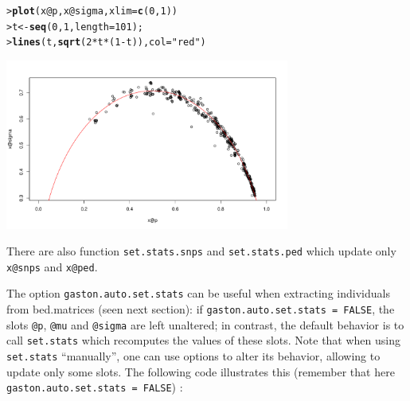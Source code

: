 \documentclass{article}\usepackage[]{graphicx}\usepackage[]{color}
\makeatletter
\newcommand{\hlnum}[1]{\textcolor[rgb]{0.686,0.059,0.569}{#1}}%
\newcommand{\hlstr}[1]{\textcolor[rgb]{0.192,0.494,0.8}{#1}}%
\newcommand{\hlopt}[1]{\textcolor[rgb]{0,0,0}{#1}}%
\newcommand{\hlstd}[1]{\textcolor[rgb]{0.345,0.345,0.345}{#1}}%
\newcommand{\hlkwb}[1]{\textcolor[rgb]{0.69,0.353,0.396}{#1}}%
\newcommand{\hlkwc}[1]{\textcolor[rgb]{0.333,0.667,0.333}{#1}}%
\newcommand{\hlkwd}[1]{\textcolor[rgb]{0.737,0.353,0.396}{\textbf{#1}}}%
\newenvironment{kframe}{%
 \def\at@end@of@kframe{}%
 \ifinner\ifhmode%
  \def\at@end@of@kframe{\end{minipage}}%
  \begin{minipage}{\columnwidth}%
 \fi\fi%
 \def\FrameCommand##1{\hskip\@totalleftmargin \hskip-\fboxsep
 \colorbox{shadecolor}{##1}\hskip-\fboxsep
     \hskip-\linewidth \hskip-\@totalleftmargin \hskip\columnwidth}%
 \MakeFramed {\advance\hsize-\width
   \@totalleftmargin\z@ \linewidth\hsize
   \@setminipage}}%
 {\par\unskip\endMakeFramed%
 \at@end@of@kframe}
\newenvironment{knitrout}{}{} %
\makeatother
\begin{document}
\begin{knitrout}
\color{fgcolor}\begin{kframe}
\begin{alltt}
\hlstd{> }\hlkwd{plot}\hlstd{(x}\hlopt{@}\hlkwc{p}\hlstd{, x}\hlopt{@}\hlkwc{sigma}\hlstd{,} \hlkwc{xlim}\hlstd{=}\hlkwd{c}\hlstd{(}\hlnum{0}\hlstd{,}\hlnum{1}\hlstd{))}
\hlstd{> }\hlstd{t} \hlkwb{<-} \hlkwd{seq}\hlstd{(}\hlnum{0}\hlstd{,}\hlnum{1}\hlstd{,}\hlkwc{length}\hlstd{=}\hlnum{101}\hlstd{);}
\hlstd{> }\hlkwd{lines}\hlstd{(t,} \hlkwd{sqrt}\hlstd{(}\hlnum{2}\hlopt{*}\hlstd{t}\hlopt{*}\hlstd{(}\hlnum{1}\hlopt{-}\hlstd{t)),} \hlkwc{col}\hlstd{=}\hlstr{"red"}\hlstd{)}
\end{alltt}
\end{kframe}

{\centering \includegraphics[width=0.7\textwidth]{figure/unnamed-chunk-14-1} 

}



\end{knitrout}

  There are also function \verb!set.stats.snps! and \verb!set.stats.ped! which
  update only \verb!x@snps! and \verb!x@ped!.

  The option \verb!gaston.auto.set.stats! can be useful when extracting 
  individuals from bed.matrices (seen next section): if
  \verb!gaston.auto.set.stats = FALSE!, the slots \verb!@p!, \verb!@mu! and \verb!@sigma!
  are left unaltered; in contrast, the default behavior is to call \verb!set.stats! 
  which recomputes the values of these slots. 
  Note that when using \verb!set.stats! ``manually'', one can use options to alter its behavior, 
  allowing to update only some slots. The following code illustrates this (remember that here 
  \verb!gaston.auto.set.stats = FALSE!) :
\end{document}
